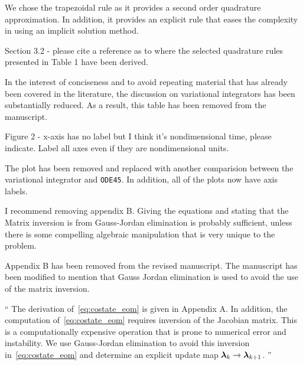 \documentclass[11pt]{article}
\newenvironment{correction}{\begin{list}{}{\setlength{\leftmargin}{1cm}\setlength{\rightmargin}{1cm}}\vspace{\parsep}\item[]``}{''\end{list}}
\begin{document}
\begin{enumerate}
We chose the trapezoidal rule as it provides a second order quadrature approximation.
In addition, it provides an explicit rule that eases the complexity in using an implicit solution method.

\item 
    \begin{itshape}
Section 3.2 - please cite a reference as to where the selected quadrature rules presented in Table 1 have been derived.
\end{itshape}

In the interest of conciseness and to avoid repeating material that has already been covered in the literature, the discussion on variational integrators has been substantially reduced.
As a result, this table has been removed from the manuscript.

\item 
    \begin{itshape}
Figure 2 - x-axis has no label but I think it's nondimensional time, please indicate.  Label all axes even if they are nondimensional units.
\end{itshape}

The plot has been removed and replaced with another comparision between the variational integrator and \texttt{ODE45}.
In addition, all of the plots now have axis labels.

\item 
    \begin{itshape}
I recommend removing appendix B.  Giving the equations and stating that the Matrix inversion is from Gauss-Jordan elimination is probably sufficient, unless there is some compelling algebraic manipulation that is very unique to the problem.
\end{itshape}

Appendix B has been removed from the revised manuscript.
The manuscript has been modified to mention that Gauss Jordan elimination is used to avoid the use of the matrix inversion.

\begin{correction}
The derivation of~\cref{eq:costate_eom} is given in Appendix A.
In addition, the computation of~\cref{eq:costate_eom} requires inversion of the Jacobian matrix.
This is a computationally expensive operation that is prone to numerical error and instability.
We use Gauss-Jordan elimination to avoid this inversion in~\cref{eq:costate_eom} and determine an explicit update map \( \bm{\lambda}_k \to \bm{\lambda}_{k+1} \).
\end{correction}


\end{enumerate}
\end{document}
